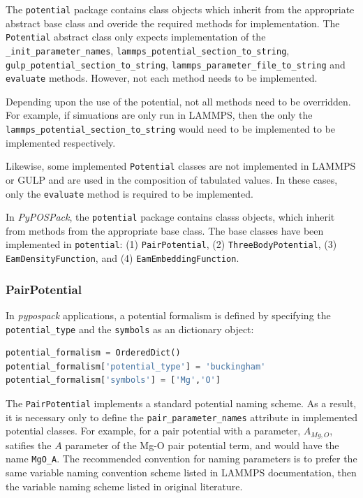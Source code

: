The \verb|potential| package contains class objects which inherit from the appropriate abstract base class and overide the required methods for implementation.  The \verb|Potential| abstract class only expects implementation of the \verb|_init_parameter_names|, \verb|lammps_potential_section_to_string|, \verb|gulp_potential_section_to_string|, \verb|lammps_parameter_file_to_string| and \verb|evaluate| methods.  However, not each method needs to be implemented.

Depending upon the use of the potential, not all methods need to be overridden.  For example, if simuations are only run in LAMMPS, then the only the \verb|lammps_potential_section_to_string| would need to be implemented to be implemented respectively.

Likewise, some implemented \verb|Potential| classes are not implemented in LAMMPS or GULP and are used in the composition of tabulated values.  In these cases, only the \verb|evaluate| method is required to be implemented.

In \emph{PyPOSPack}, the \verb|potential| package contains classs objects, which inherit from methods from the appropriate base class.  The base classes have been implemented in \verb|potential|: (1) \verb|PairPotential|, (2) \verb|ThreeBodyPotential|, (3) \verb|EamDensityFunction|, and (4) \verb|EamEmbeddingFunction|.
\subsubsection{PairPotential}

In \emph{pypospack} applications, a potential formalism is defined by specifying the \verb|potential_type| and the \verb|symbols| as an dictionary object:
\begin{lstlisting}[language=Python]
potential_formalism = OrderedDict()
potential_formalism['potential_type'] = 'buckingham'
potential_formalism['symbols'] = ['Mg','O']
\end{lstlisting}

The \verb|PairPotential| implements a standard potential naming scheme.  As a result, it is necessary only to define the \verb|pair_parameter_names| attribute in implemented potential classes.  For example, for a pair potential with a parameter, $A_{Mg,O}$, satifies the $A$ parameter of the Mg-O pair potential term, and would have the name \verb|MgO_A|.  The recommended convention for naming parameters is to prefer the same variable naming convention scheme listed in LAMMPS documentation, then the variable naming scheme listed in original literature.

